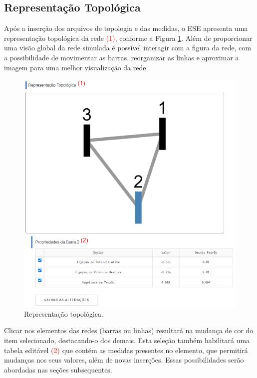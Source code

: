 \documentclass{article}
\begin{document}
\subsection{Representação Topológica}
Após a inserção dos arquivos de topologia e das medidas, o ESE apresenta uma representação topológica da rede \textcolor{red}{(1)}, conforme a Figura \ref{fig::topology}. Além de proporcionar uma visão global da rede simulada é possível interagir com a figura da rede, com a possibilidade de movimentar as barras, reorganizar as linhas e aproximar a imagem para uma melhor visualização da rede.  

\begin{figure}[H]
    \centering
    \includegraphics[scale = .47]{Imagens/Representação_Topologica.png}
    \caption{Representação topológica.}
    \label{fig::topology}
\end{figure}

Clicar nos elementos das redes (barras ou linhas) resultará na mudança de cor do item selecionado, destacando-o dos demais. Esta seleção também habilitará uma tabela editável \textcolor{red}{(2)} que contém as medidas presentes no elemento, que permitirá mudanças nos seus valores, além de novas inserções. Essas possibilidades serão abordadas nas seções subsequentes. 
\end{document}
